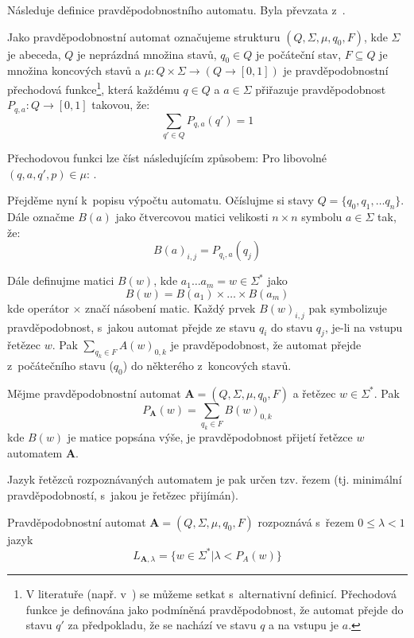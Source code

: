 Následuje definice pravděpodobnostního automatu. Byla převzata z~\cite{Rab-ProbAut}.
\begin{definition}
 Jako pravděpodobnostní automat označujeme strukturu $(Q, \Sigma, \mu, q_0, F)$, kde $\Sigma$ je abeceda, $Q$ je neprázdná množina stavů, $q_0 \in Q$ je počáteční stav, $F \subseteq Q$ je množina koncových stavů a $\mu: Q \times \Sigma \rightarrow (Q \rightarrow [0,1])$ je pravděpodobnostní přechodová funkce\footnote{V literatuře (např. v~\cite{San-ReaFuzLanProMaxMaxAut}) se můžeme setkat s~alternativní definicí. Přechodová funkce je definována jako podmíněná pravděpodobnost, že automat přejde do stavu $q'$ za předpokladu, že se nachází ve stavu $q$ a na vstupu je $a$.}, která každému $q \in Q$ a $a \in \Sigma$ přiřazuje pravděpodobnost $P_{q,a}: Q \rightarrow [0,1]$ takovou, že:
 $$   
  \sum_{q' \in Q} P_{q, a}(q') = 1 
 $$
\end{definition}

Přechodovou funkci lze číst následujícím způsobem: Pro libovolné $(q, a, q', p) \in \mu$: .

Přejděme nyní k~popisu výpočtu automatu. Očíslujme si stavy $Q = \{ q_0, q_1, \dots q_n \}$. Dále označme $B(a)$ jako čtvercovou matici velikosti $n \times n$ symbolu $a \in \Sigma$ tak, že:
$$
  B(a)_{i, j} = P_{q_i, a}(q_j)
$$

Dále definujme matici $B(w)$, kde $a_1 \dots a_m = w \in \Sigma^*$ jako
$$
  B(w) = B(a_1) \times \dots \times B(a_m)
$$
kde operátor $\times$ značí násobení matic. Každý prvek $B(w)_{i,j}$ pak symbolizuje pravděpodobnost, s~jakou automat přejde ze stavu $q_i$ do stavu $q_j$, je-li na vstupu řetězec $w$. Pak $\sum_{q_k \in F} A(w)_{0, k}$ je pravděpodobnost, že automat přejde z~počátečního stavu ($q_0$) do některého z~koncových stavů.

\begin{definition}
 Mějme pravděpodobnostní automat $\mathbf{A} = (Q, \Sigma, \mu, q_0, F)$ a řetězec $w \in \Sigma^*$. Pak 
 $$
  P_\mathbf{A}(w) = \sum_{q_k \in F} B(w)_{0, k}
 $$ 
 kde $B(w)$ je matice popsána výše, je pravděpodobnost přijetí řetězce $w$ automatem $\mathbf{A}$.
\end{definition}

Jazyk řetězců rozpoznávaných automatem je pak určen tzv. řezem (tj. minimální pravděpodobností, s~jakou je řetězec přijímán).
\begin{definition}
 Pravděpodobnostní automat $\mathbf{A} = (Q, \Sigma, \mu, q_0, F)$ rozpoznává s~řezem $0 \leq \lambda < 1$ jazyk
 $$
  L_{\mathbf{A},\lambda} = \{ w \in \Sigma^* | \lambda < P_A(w) \}
 $$
\end{definition}

